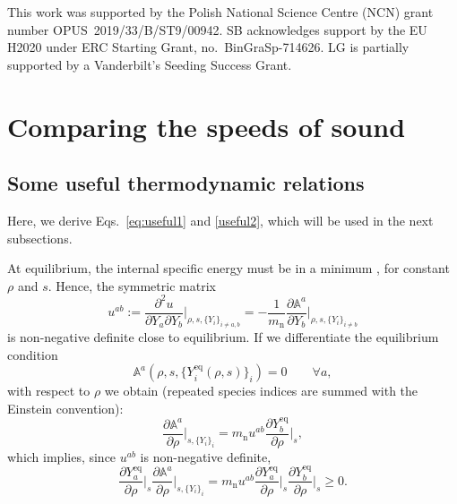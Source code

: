 \documentclass[aps,prd,twocolumn,a4paper,floatfix,nofootbib,superscriptaddress,nofootinbib]{revtex4}
\newcommand{\rn}{\mathrm{n}}
\newcommand{\req}{\mathrm{eq}}
\begin{document}
\begin{acknowledgments}
This work was supported by the Polish National Science Centre (NCN) grant number OPUS~2019/33/B/ST9/00942.
SB acknowledges support by the EU H2020 under ERC Starting Grant, no.~BinGraSp-714626.
LG is partially supported by a Vanderbilt's Seeding Success Grant.
\end{acknowledgments}




\appendix

\section{Comparing the speeds of sound}
\label{sec:cs-vs-cs}

\subsection{Some useful thermodynamic relations}
\label{ssec:thermo-useful}

Here, we derive Eqs.~\eqref{eq:useful1} and \eqref{useful2}, which will
be used in the next subsections.

At equilibrium, the internal specific energy must be in a minimum \cite{Callen_book,GavassinoGibbs2021}, for
constant $\rho$ and $s$. Hence, the symmetric matrix
%
\begin{equation}
u^{ab}:= \dfrac{\partial^2 u}{\partial Y_a \partial Y_b}
\bigg|_{\rho,s,\{Y_i\}_{i\neq a,b}} = -\dfrac{1}{m_\rn} \dfrac{\partial
\mathbb{A}^a}{\partial Y_b}\bigg|_{\rho,s,\{Y_i\}_{i\neq b}}
\end{equation}
%
is non-negative definite close to equilibrium.
%
If we differentiate the equilibrium condition
%
\begin{equation}
\mathbb{A}^a (\rho,s, \{Y_i^\req(\rho,s)\}_i )=0\qquad\forall a,
\end{equation}
%
with respect to $\rho$ we obtain (repeated species indices are summed with the Einstein convention):
%
\begin{equation}
\dfrac{\partial \mathbb{A}^a}{\partial \rho}\bigg|_{s,\{Y_i\}_i} = m_\rn
u^{ab} \dfrac{\partial Y_b^\req}{\partial \rho} \bigg|_s ,
\end{equation}
%
which implies, since $u^{ab}$ is non-negative definite,
%
\begin{equation}
\label{eq:useful1}
\dfrac{\partial Y_a^\req}{\partial \rho} \bigg|_s\dfrac{\partial
\mathbb{A}^a}{\partial \rho}\bigg|_{s,\{Y_i\}_i} = m_\rn  u^{ab}
\dfrac{\partial Y_a^\req}{\partial \rho} \bigg|_s \dfrac{\partial
Y_b^\req}{\partial \rho} \bigg|_s \geq 0.
\end{equation}
\end{document}
